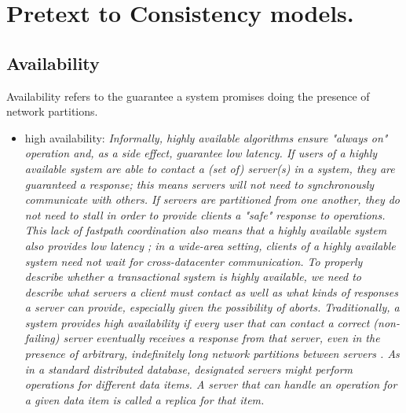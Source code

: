 \documentclass[a4paper,10pt,titlepage]{report}
\begin{document}
    \newpage


    \section{Pretext to Consistency models.}

    \subsection{Availability}

    Availability refers to the guarantee a system promises doing the presence of network partitions.\cite{HighlyAvailableTransactionsVirtuesandLimitations}

    \begin{itemize}
    \item high availability: 
    \textit{
    Informally, highly available algorithms ensure "always on" operation and, as a side effect, guarantee low latency. If users of a    highly available system are able to contact a (set of) server(s) in    a system, they are guaranteed a response; this means servers will    not need to synchronously communicate with others. If servers are    partitioned from one another, they do not need to stall in order to    provide clients a "safe" response to operations. This lack of fastpath coordination also means that a highly available system also    provides low latency ; in a wide-area setting, clients of a highly    available system need not wait for cross-datacenter communication. To properly describe whether a transactional system is highly    available, we need to describe what servers a client must contact    as well as what kinds of responses a server can provide, especially    given the possibility of aborts.    Traditionally, a system provides high availability if every user    that can contact a correct (non-failing) server eventually receives a    response from that server, even in the presence of arbitrary, indefinitely long network partitions between servers \cite{CAP}. As in a standard distributed database, designated servers might perform operations for different data items. A server that can handle an operation    for a given data item is called a replica for that item.}\cite{HighlyAvailableTransactionsVirtuesandLimitations}

\end{itemize}
\end{document}
